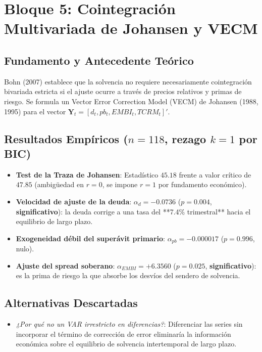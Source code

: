 \documentclass[11pt,a4paper]{article}
\begin{document}
\vspace{1em}

\section{Bloque 5: Cointegración Multivariada de Johansen y VECM}

\subsection{Fundamento y Antecedente Teórico}
Bohn (2007) establece que la solvencia no requiere necesariamente cointegración bivariada estricta si el ajuste ocurre a través de precios relativos y primas de riesgo. Se formula un Vector Error Correction Model (VECM) de Johansen (1988, 1995) para el vector $\mathbf{Y}_t = [d_t, pb_t, EMBI_t, TCRM_t]'$.

\subsection{Resultados Empíricos ($n=118$, rezago $k=1$ por BIC)}
\begin{itemize}[leftmargin=1.5em]
    \item \textbf{Test de la Traza de Johansen}: Estadístico $45.18$ frente a valor crítico de $47.85$ (ambigüedad en $r=0$, se impone $r=1$ por fundamento económico).
    \item \textbf{Velocidad de ajuste de la deuda}: $\alpha_{d} = \mathbf{-0.0736}$ ($p = \mathbf{0.004}$, \textbf{significativo}): la deuda corrige a una tasa del **7.4\% trimestral** hacia el equilibrio de largo plazo.
    \item \textbf{Exogeneidad débil del superávit primario}: $\alpha_{pb} = -0.000017$ ($p = 0.996$, nulo).
    \item \textbf{Ajuste del spread soberano}: $\alpha_{EMBI} = \mathbf{+6.3560}$ ($p = \mathbf{0.025}$, \textbf{significativo}): es la prima de riesgo la que absorbe los desvíos del sendero de solvencia.
\end{itemize}

\subsection{Alternativas Descartadas}
\begin{itemize}[leftmargin=1.5em]
    \item \textit{¿Por qué no un VAR irrestricto en diferencias?}: Diferenciar las series sin incorporar el término de corrección de error eliminaría la información económica sobre el equilibrio de solvencia intertemporal de largo plazo.
\end{itemize}
\end{document}
